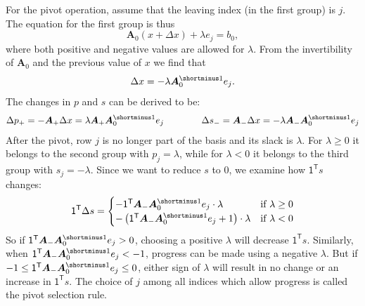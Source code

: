 \documentclass[a4paper, 12pt]{article}
\newcommand{\minv} { {\shortminus1} }
\newcommand{\mtrp} {\mathsf{T}}
\newcommand{\one} {\mathsf{1}}
\begin{document}
For the pivot operation, assume that the leaving index (in the first group) is $j$. The equation for the first group is thus
\begin{equation*}
\bm{A}_0 \left(x + \Delta x \right) + \lambda e_j = b_0,
\end{equation*}
where both positive and negative values are allowed for $\lambda$. From the invertibility of $\bm{A}_0$ and the previous value of $x$ we find that
\begin{equation*}
\Delta x = - \lambda \bm{A}_0^\minv e_j.
\end{equation*}
The changes in $p$ and $s$ can be derived to be:
\begin{equation*}
\Delta p_+ = - \bm{A}_+ \Delta x = \lambda \bm{A}_+ \bm{A}_0^\minv e_j \qquad\qquad
\Delta s_- = \bm{A}_- \Delta x = - \lambda \bm{A}_- \bm{A}_0^\minv e_j
\end{equation*}
After the pivot, row $j$ is no longer part of the basis and its slack is $\lambda$. For $\lambda \geq 0$ it belongs to the second group with $p_j = \lambda$, while for $\lambda < 0$ it belongs to the third group with $s_j = -\lambda$.
Since we want to reduce $s$ to 0, we examine how $\one^\mtrp s$ changes:
\begin{equation*}
\one^\mtrp \Delta s
= \begin{cases}
- \one^\mtrp \bm{A}_- \bm{A}_0^\minv e_j \cdot \lambda & \text{if $\lambda \geq 0$} \\
- \left(\one^\mtrp \bm{A}_- \bm{A}_0^\minv e_j + 1\right) \cdot \lambda & \text{if $\lambda < 0$}
\end{cases}
\end{equation*}
So if $\one^\mtrp \bm{A}_- \bm{A}_0^\minv e_j > 0$, choosing a positive $\lambda$ will decrease $\one^\mtrp s$. Similarly, when $\one^\mtrp \bm{A}_- \bm{A}_0^\minv e_j < -1$, progress can be made using a negative $\lambda$. But if $-1 \leq \one^\mtrp \bm{A}_- \bm{A}_0^\minv e_j \leq 0$, either sign of $\lambda$ will result in no change or an increase in $\one^\mtrp s$. The choice of $j$ among all indices which allow progress is called the pivot selection rule.
\end{document}
